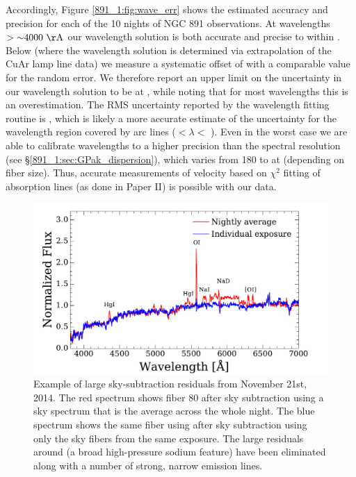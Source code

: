 Accordingly, Figure \ref{891_1:fig:wave_err} shows the estimated accuracy
and precision for each of the 10 nights of NGC 891 observations.  At
wavelengths $>\val{\asim 4000}{\AA}$ our wavelength solution is both
accurate and precise to within . Below
 (where the wavelength solution is determined via
extrapolation of the CuAr lamp line data) we measure a systematic
offset of  with a comparable value for the random
error. We therefore report an upper limit on the uncertainty in our
wavelength solution to be  at , while
noting that for most wavelengths this is an overestimation.  The RMS
uncertainty reported by the wavelength fitting routine is , which is likely a more accurate estimate of the
uncertainty for the wavelength region covered by arc lines
($<\lambda <$ ).  Even in the worst case
we are able to calibrate wavelengths to a higher precision than the
spectral resolution (see \S\ref{891_1:sec:GPak_dispersion}), which varies
from 180 to  at  (depending on fiber
size). Thus, accurate measurements of velocity based on $\chi^2$
fitting of absorption lines (as done in Paper II) is possible with our
data.



\begin{figure}
  \centering
  \includegraphics[width=\columnwidth]{891_1/figs/skysub_comp.pdf}
  \caption[Sky subtraction example]{\label{891_1:fig:skysub_comp}\fixspacing Example of large
    sky-subtraction residuals from November 21st, 2014. The red
    spectrum shows fiber 80 after sky subtraction using a sky spectrum
    that is the average across the whole night. The blue spectrum
    shows the same fiber using after sky subtraction using only the
    sky fibers from the same exposure. The large residuals around
     (a broad high-pressure sodium feature) have been
    eliminated along with a number of strong, narrow emission lines.}
\end{figure}

